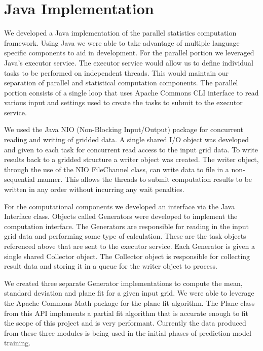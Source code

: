 \section{Java Implementation}
We developed a Java implementation of the parallel statistics computation framework. 
Using Java we were able to take advantage of multiple language specific components to aid in development. 
For the parallel portion we leveraged Java’s executor service. 
The executor service would allow us to define individual tasks to be performed on independent threads. 
This would maintain our separation of parallel and statistical computation components. 
The parallel portion consists of a single loop that uses Apache Commons CLI interface to read various input and settings used to create the tasks to submit to the executor service.

\par
We used the Java NIO (Non-Blocking Input/Output) package for concurrent reading and writing of gridded data. 
A single shared I/O object was developed and given to each task for concurrent read access to the input grid data. 
To write results back to a gridded structure a writer object was created. 
The writer object, through the use of the NIO FileChannel class, can write data to file in a non-sequential manner. 
This allows the threads to submit computation results to be written in any order without incurring any wait penalties.

\par
For the computational components we developed an interface via the Java Interface class. 
Objects called Generators were developed to implement the computation interface. 
The Generators are responsible for reading in the input grid data and performing some type of calculation. 
These are the task objects referenced above that are sent to the executor service. 
Each Generator is given a single shared Collector object. 
The Collector object is responsible for collecting result data and storing it in a queue for the writer object to process.

\par
We created three separate Generator implementations to compute the mean, standard deviation and plane fit for a given input grid. 
We were able to leverage the Apache Commons Math package for the plane fit algorithm. 
The Plane class from this API implements a partial fit algorithm that is accurate enough to fit the scope of this project and is very performant. 
Currently the data produced from these three modules is being used in the initial phases of prediction model training.